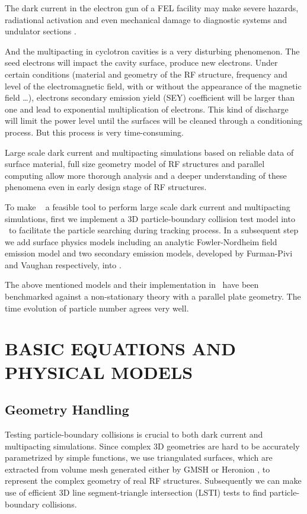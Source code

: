 \documentclass[aps,prstab,superscriptaddress,showpacs]{revtex4-1}
\begin{document}
The dark current in the electron gun of a FEL facility may make severe hazards, radiational activation and even mechanical damage to diagnostic systems and undulator sections \cite{J-H-Han}. 

And the multipacting in cyclotron cavities is a very disturbing phenomenon. The seed electrons will impact the cavity surface, produce new electrons. Under certain conditions (material and geometry of the RF structure, frequency and level of the electromagnetic field, with or without the appearance of the magnetic field \ldots), electrons secondary emission yield (SEY) coefficient will be larger than one and lead to exponential multiplication of electrons. This kind of discharge will limit the power level until the surfaces will be cleaned through a conditioning process. But this process is very time-consuming. \cite{CY, riken}

 Large scale dark current and multipacting simulations based on reliable data of surface material, full size geometry model of RF structures and parallel computing allow more thorough analysis and a deeper understanding of these phenomena even in early design stage of RF structures.  

To make \opal\ \cite{opal:1} a feasible tool to perform large scale dark current and multipacting simulations, first we implement a 3D particle-boundary collision test model into \opal\ to facilitate the particle searching during tracking process. In a subsequent step we add surface physics models including an analytic Fowler-Nordheim field emission model and two secondary emission models, developed by Furman-Pivi and Vaughan respectively, into \opal.

The above mentioned models and their implementation in \opal\ have been benchmarked against a non-stationary theory \cite{Non} with a parallel plate geometry. The time evolution of particle number agrees very well.


\section{BASIC EQUATIONS AND PHYSICAL MODELS }


\subsection{Geometry Handling}
Testing particle-boundary collisions is crucial to both dark current and multipacting simulations. Since complex 3D geometries are hard to be accurately parametrized by simple functions, we use triangulated surfaces, which are extracted from volume mesh generated either by GMSH \cite{gmsh} or Heronion \cite{heronion}, to represent the complex geometry of real RF structures. Subsequently we can make use of efficient 3D line segment-triangle intersection (LSTI) tests to find particle-boundary collisions. 
\end{document}
